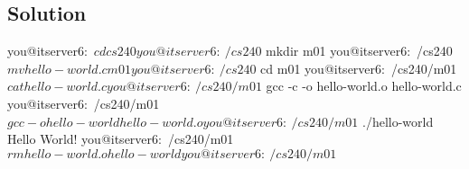 
\subsection*{Solution}

\begin{terminal}
you@itserver6:~$ cd cs240
you@itserver6:~/cs240$ mkdir m01
you@itserver6:~/cs240$ mv hello-world.c m01
you@itserver6:~/cs240$ cd m01
you@itserver6:~/cs240/m01$ cat hello-world.c
you@itserver6:~/cs240/m01$ gcc -c -o hello-world.o hello-world.c
you@itserver6:~/cs240/m01$ gcc -o hello-world hello-world.o
you@itserver6:~/cs240/m01$ ./hello-world
Hello World!
you@itserver6:~/cs240/m01$ rm hello-world.o hello-world
you@itserver6:~/cs240/m01$
\end{terminal}

